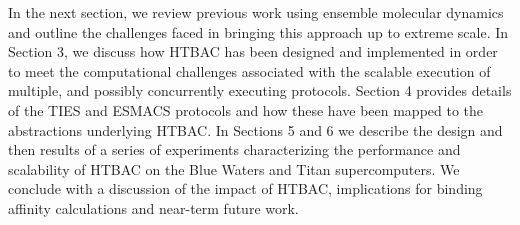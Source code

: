 In the next section, we review previous work using ensemble molecular dynamics
and outline the challenges faced in bringing this approach up to extreme
scale. In Section 3, we discuss how HTBAC has been designed and implemented in
order to meet the computational challenges associated with the scalable
execution of multiple, and possibly concurrently executing protocols. Section 4 provides details of the TIES and ESMACS protocols and how these 
have been mapped to the abstractions underlying HTBAC. 
In Sections 5 and 6 we describe
the design and then results of a series of experiments characterizing the
performance and scalability of HTBAC on the Blue Waters and Titan
supercomputers. 
We conclude with a discussion of the impact of HTBAC,
implications for binding affinity calculations and near-term future work.
